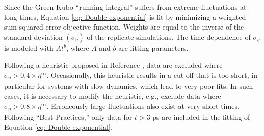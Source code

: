 \documentclass[preprint,review,12pt]{elsarticle}
\begin{document}
	
	Since the Green-Kubo ``running integral'' suffers from extreme fluctuations at long times, Equation \ref{eq: Double exponential} is fit by minimizing a weighted sum-squared error objective function. Weights are equal to the inverse of the standard deviation $(\sigma_{\eta})$ of the replicate simulations. The time dependence of $\sigma_{\eta}$ is modeled with $A t^{b}$, where $A$ and $b$ are fitting parameters.
	
	Following a heuristic proposed in Reference , data are excluded where $\sigma_{\eta} > 0.4 \times \eta^{\infty}$. Occasionally, this heuristic results in a cut-off that is too short, in particular for systems with slow dynamics, which lead to very poor fits. In such cases, it is necessary to modify the heuristic, e.g., exclude data where $\sigma_{\eta} > 0.8 \times \eta^{\infty}$. Erroneously large fluctuations also exist at very short times. Following ``Best Practices,'' only data for $t > 3$ ps are included in the fitting of Equation \ref{eq: Double exponential}. 
	 
	
\end{document}
